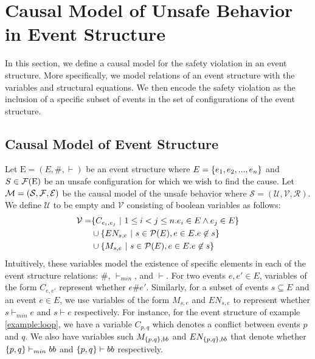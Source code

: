 \section{Causal Model of Unsafe Behavior in Event Structure}

In this section, we define a causal model for the safety violation
in an event structure. 
More specifically, we model relations of an event structure 
with the variables and structural equations. 
We then encode the safety violation as the inclusion of a specific
subset of events in the set of configurations of the event structure.


\subsection{Causal Model of Event Structure}
Let $\mathrm{E} = (E,\#,\vdash)$ be an event structure where
$E = \{e_1, e_2, ...,e_n\}$ and $S \in \mathcal{F}(\mathrm{E})$ be an unsafe
configuration for which we wish to find the cause.
Let $\mathcal{M} = (\mathcal{S},\mathcal{F},\mathcal{E})$ be the causal model of the unsafe 
behavior where $\mathcal{S} = (\mathcal{U},\mathcal{V},\mathcal{R})$.
We define $\mathcal{U}$ to be empty and $\mathcal{V}$
consisting of boolean variables as follows:
\begin{align*}
    \mathcal{V} = & \{C_{e_i,e_j} ~|~  1 \leq i < j \leq n.
    e_i \in E \wedge e_j \in E\}                                \\
                  & \cup \{EN_{s,e} ~|~ s \in \mathcal{P}(E),
    e \in E. e \not \in s \}                                    \\
                  & \cup \{M_{s,e} ~|~ s \in \mathcal{P}(E),
        e \in E. e \not \in s \}
\end{align*}
Intuitively, these variables model the existence of specific elements in
each of the event structure relations: $\#$, $\vdash_{min}$, and $\vdash$.
For two events $e,e' \in E$, variables of the form $C_{e,e'}$ represent whether $e\#e'$.
Similarly, for a subset of events $s \subseteq E$ and an event $e \in E$,
we use variables of the form $M_{s,e}$ and $EN_{s,e}$ to represent
whether $s \vdash_{min} e$ and $s \vdash e$ respectively.
For instance, for the event structure of example \ref{example:loop}, 
we have a variable $C_{p,q}$ which denotes a conflict between events 
$p$ and $q$.
We also have variables such $M_{\{p,q\},bb}$ and $EN_{\{p,q\},bb}$ that denote 
whether $\{p,q\} \vdash_{min} bb$ and $\{p,q\} \vdash bb$ respectively.


